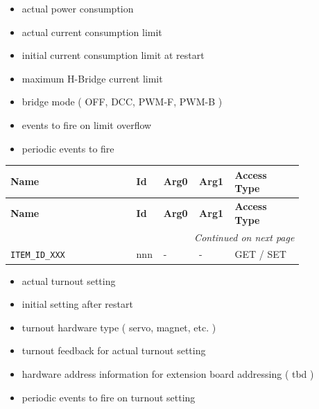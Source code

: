 
\begin{itemize}
\item actual power consumption
\item actual current consumption limit
\item initial current consumption limit at restart
\item maximum H-Bridge current limit
\item bridge mode ( OFF, DCC, PWM-F, PWM-B )
\item events to fire on limit overflow
\item periodic events to fire
\end{itemize}

\begin{longtable}{@{}|p{0.4\linewidth}|p{0.06\linewidth}|p{0.08\linewidth}|p{0.08\linewidth}|p{0.22\linewidth}|@{}}
    \toprule
    \textbf{Name} & \textbf{Id} & \textbf{Arg0} & \textbf{Arg1} & \textbf{Access Type} \\
    \midrule
    \midrule
    \endfirsthead
    \toprule
    \textbf{Name} & \textbf{Id} & \textbf{Arg0} & \textbf{Arg1} & \textbf{Access Type} \\
    \midrule
     \midrule
    \endhead
    \midrule
    \multicolumn{5}{r}{\textit{Continued on next page}} \\
    \midrule
    \endfoot
    \bottomrule
    \endlastfoot

    \texttt{ITEM\_ID\_XXX}       & nnn   & - & - & GET / SET \\
    \midrule
   
\end{longtable}



\begin{itemize}
\item actual turnout setting
\item initial setting after restart
\item turnout hardware type ( servo, magnet, etc. )
\item turnout feedback for actual turnout setting
\item hardware address information for extension board addressing ( tbd )
\item periodic events to fire on turnout setting
\end{itemize}

